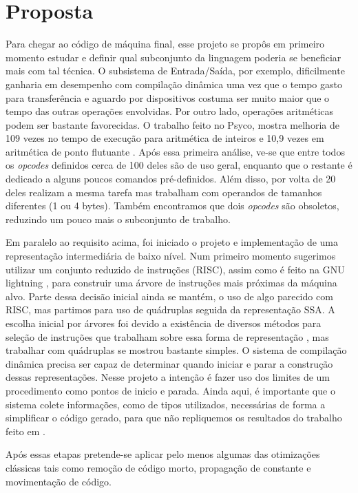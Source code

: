 \section{Proposta}
\label{proposta}

Para chegar ao código de máquina final, esse projeto se propôs em
primeiro momento estudar e definir qual subconjunto da linguagem poderia
se beneficiar mais com tal técnica. O subsistema de Entrada/Saída, por
exemplo, dificilmente ganharia em desempenho com compilação dinâmica
uma vez que o tempo gasto para transferência e aguardo por dispositivos
costuma ser muito maior que o tempo das outras operações envolvidas.
Por outro lado, operações aritméticas podem ser bastante favorecidas.
O trabalho feito no Psyco, mostra melhoria
de 109 vezes no tempo de execução para aritmética de inteiros e 10,9
vezes em aritmética de ponto flutuante \cite{psyco}. Após essa
primeira análise, ve-se que entre todos os
\textit{opcodes} definidos cerca de 100 deles são de
uso geral, enquanto que o restante é dedicado a alguns poucos comandos
pré-definidos. Além disso, por volta de 20 deles realizam a mesma
tarefa mas trabalham com operandos de tamanhos diferentes (1 ou 4
bytes). Também encontramos que dois \textit{opcodes} são obsoletos,
reduzindo um pouco mais o subconjunto de trabalho.

Em paralelo ao requisito acima, foi iniciado o projeto e
implementação de uma representação intermediária de baixo
nível. Num primeiro momento sugerimos utilizar um conjunto reduzido de
instruções (RISC), assim como é feito na GNU lightning \cite{gnu_lightning},
para construir uma
árvore de instruções mais próximas da máquina alvo. Parte dessa
decisão inicial ainda se mantém, o uso de algo parecido com RISC, mas
partimos para uso de quádruplas seguida da representação SSA.
A escolha inicial por árvores foi devido
a existência de diversos métodos para seleção de
instruções que trabalham sobre essa forma de representação
\cite{ir_tree_parsing}, mas trabalhar com quádruplas se mostrou
bastante simples. O sistema de compilação dinâmica precisa ser
capaz de determinar quando iniciar e parar a construção dessas
representações.
Nesse projeto a intenção é fazer uso dos
limites de um procedimento como pontos de inicio e parada. Ainda aqui,
é importante que o sistema colete informações, como de tipos
utilizados, necessárias de forma a simplificar o código gerado, para
que não repliquemos os resultados do trabalho feito em
\cite{vitale_catenation}.

Após essas etapas pretende-se aplicar pelo menos algumas das
otimizações clássicas tais como remoção de código morto, propagação de
constante e movimentação de código.

